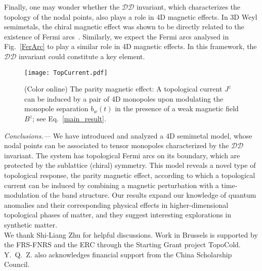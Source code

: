 \documentclass[twocolumn,prl,10pt,superscriptaddress]{revtex4}
\begin{document}
Finally, one may wonder whether the $\mathcal{DD}$ invariant, which characterizes the topology of the nodal points, also plays a role in 4D magnetic effects. In 3D Weyl semimetals, the chiral magnetic effect was shown to be directly related to the existence of Fermi arcs~\cite{Beenakker}. Similarly, we expect the Fermi arcs analysed in Fig.~\ref{FerArc} to play a similar role in 4D magnetic effects. In this framework, the $\mathcal{DD}$ invariant could constitute a key element.

\begin{figure}[htbp]\centering
\texttt{[image: TopCurrent.pdf]}
 \caption{(Color online) The parity magnetic effect: A topological current $J^z$ can be induced
by a pair of 4D monopoles upon modulating the monopole separation $b_w(t)$ in the presence of a weak magnetic field $B^z$; see Eq.~\eqref{main_result}. } \label{Current}
\end{figure}





\emph{Conclusions.---} We have introduced and analyzed a 4D semimetal model, whose nodal points can be associated to tensor monopoles characterized by the $\mathcal{DD}$ invariant. The system has topological Fermi arcs on its boundary, which are protected by the sublattice (chiral) symmetry. This model reveals a novel type of topological response, the parity magnetic effect, according to which a topological current can be induced by combining a magnetic perturbation with a time-modulation of the band structure. Our results expand our knowledge of quantum anomalies and their corresponding physical effects in higher-dimensional topological phases of matter, and they suggest interesting explorations in synthetic matter.\\




We thank Shi-Liang Zhu for helpful discussions. Work in Brussels is supported by the FRS-FNRS and the ERC through the Starting Grant project TopoCold. Y.~Q.~Z. also acknowledges financial support from the China Scholarship Council.
\end{document}
